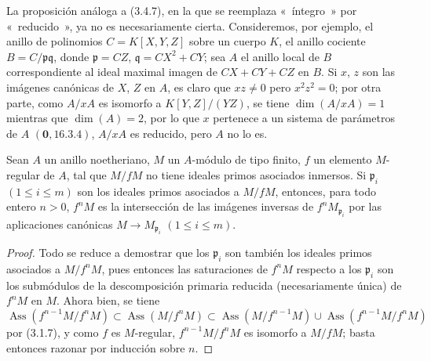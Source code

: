 \begin{remark}[3.4.8]
\label{IV.2.3.4.8-fr}
La proposición análoga a (3.4.7), en la que se reemplaza «~íntegro~» por
«~reducido~», ya no es necesariamente cierta. Consideremos, por ejemplo, el
anillo de polinomios $C=K[X,Y,Z]$ sobre un cuerpo $K$, el anillo cociente
$B=C/\mathfrak p\mathfrak q$, donde $\mathfrak p=CZ$,
$\mathfrak q=CX^2+CY$; sea $A$ el anillo local de $B$ correspondiente al ideal
maximal imagen de $CX+CY+CZ$ en $B$. Si $x$, $z$ son las imágenes canónicas de
$X$, $Z$ en $A$, es claro que $xz\neq0$ pero $x^2z^2=0$; por otra parte, como
$A/xA$ es isomorfo a $K[Y,Z]/(YZ)$, se tiene $\dim(A/xA)=1$ mientras que
$\dim(A)=2$, por lo que $x$ pertenece a un sistema de parámetros de $A$
$(\mathbf{0},16.3.4)$, $A/xA$ es reducido, pero $A$ no lo es.
\end{remark}

\begin{proposition}[3.4.9]
\label{IV.2.3.4.9-fr}
Sean $A$ un anillo noetheriano, $M$ un $A$-módulo de tipo finito, $f$ un
elemento $M$-regular de $A$, tal que $M/fM$ no tiene ideales primos
asociados inmersos. Si $\mathfrak p_i$ $(1\leqslant i\leqslant m)$ son los
ideales primos asociados a $M/fM$, entonces, para todo entero $n>0$, $f^nM$
es la intersección de las imágenes inversas de $f^nM_{\mathfrak p_i}$ por
las aplicaciones canónicas $M\to M_{\mathfrak p_i}$ $(1\leqslant i\leqslant m)$.
\end{proposition}

\begin{proof}
Todo se reduce a demostrar que los $\mathfrak p_i$ son también los ideales
primos asociados a $M/f^nM$, pues entonces las saturaciones de $f^nM$ respecto
a los $\mathfrak p_i$ son los submódulos de la descomposición primaria reducida
(necesariamente única) de $f^nM$ en $M$. Ahora bien, se tiene
\[
\operatorname{Ass}(f^{n-1}M/f^nM)
\subset\operatorname{Ass}(M/f^nM)
\subset\operatorname{Ass}(M/f^{n-1}M)
\cup\operatorname{Ass}(f^{n-1}M/f^nM)
\]
por (3.1.7), y como $f$ es $M$-regular,
$f^{n-1}M/f^nM$ es isomorfo a $M/fM$; basta entonces razonar por
inducción sobre $n$.
\end{proof}

